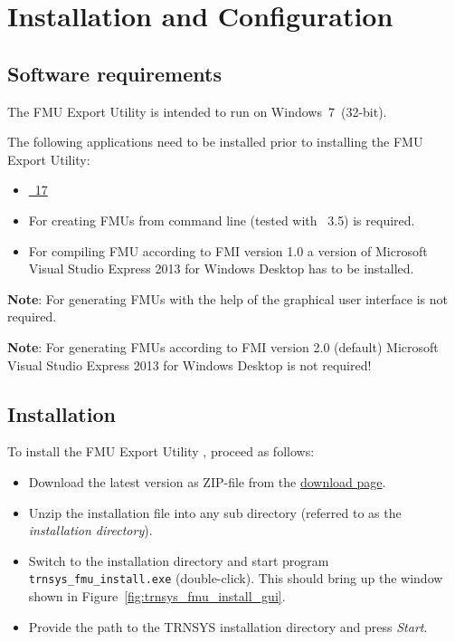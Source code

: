 \chapter{Installation and Configuration}

\section{Software requirements}

The \fmipp \trnsys FMU Export Utility is intended to run on Windows~7~(32-bit).

The following applications need to be installed prior to installing the \fmipp \trnsys FMU Export Utility:
\begin{itemize}

  \item \href{http://www.trnsys.com/}{\trnsys~17}

  \item For creating FMUs from command line \href{https://www.python.org/}{\python} (tested with \python~3.5) is required.

  \item For compiling FMU according to FMI version 1.0 a version of Microsoft Visual Studio Express 2013 for Windows Desktop has to be installed.
\end{itemize}

\textbf{Note}: For generating FMUs with the help of the graphical user interface \python is not required.

\textbf{Note}: For generating FMUs according to FMI version 2.0 (default) Microsoft Visual Studio Express 2013 for Windows Desktop is not required!


\section{Installation}
\label{sec:install}

To install the \fmipp \trnsys FMU Export Utility , proceed as follows:
\begin{itemize}

  \item Download the latest version as ZIP-file from the \href{http://sourceforge.net/projects/trnsys-fmu/files/latest/download}{download page}.

  \item Unzip the installation file into any sub directory (referred to as the \emph{installation directory}).

  \item Switch to the installation directory and start program \texttt{trnsys\_fmu\_install.exe} (double-click).
  This should bring up the window shown in Figure~\ref{fig:trnsys_fmu_install_gui}.

  \item Provide the path to the TRNSYS installation directory and press \textit{Start}.

\end{itemize}

